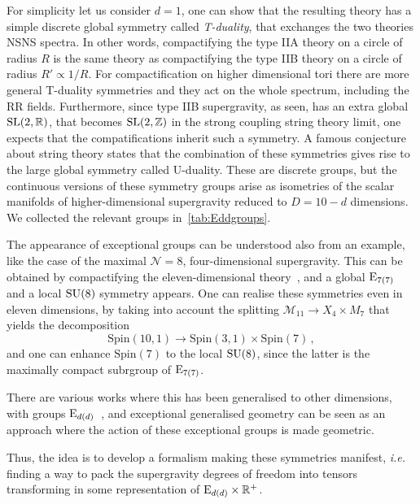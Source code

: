 \documentclass[debug]{phd}
\begin{document}
					For simplicity let us consider $d=1$, one can show that the resulting theory has a simple discrete global symmetry called \emph{T-duality}, that exchanges the two theories NSNS spectra.
					In other words, compactifying the type IIA theory on a circle of radius $R$ is the same theory as compactifying the type IIB theory on a circle of radius $R' \propto 1/R$.
					For compactification on higher dimensional tori there are more general T-duality symmetries and they act on the whole spectrum, including the RR fields.
					Furthermore, since type IIB supergravity, as seen, has an extra global $\mathrm{SL}(2, \mathbb{R})$, that becomes $\mathrm{SL}(2,\mathbb{Z})$ in the strong coupling string theory limit, one expects that the compatifications inherit such a symmetry.
					A famous conjecture about string theory states that the combination of these symmetries gives rise to the large global symmetry called U-duality.
					These are discrete groups, but the continuous versions of these symmetry groups arise as isometries of the scalar manifolds of higher-dimensional supergravity reduced to $D=10-d$ dimensions. 
					We collected the relevant groups in~\cref{tab:Eddgroups}.
					
					The appearance of exceptional groups can be understood also from an example, like the case of the maximal $\mathcal{N}=8$, four-dimensional supergravity.
					This can be obtained by compactifying the eleven-dimensional theory~\cite{CremmerJulia}, and a global $\mathrm{E}_{7(7)}$ and a local $\mathrm{SU}(8)$ symmetry appears.
					One can realise these symmetries even in eleven dimensions, by taking into account the splitting $\mathcal{M}_{11} \rightarrow X_4 \times M_7$ that yields the decomposition
							\begin{equation*}
								\mathrm{Spin}(10,1) \rightarrow \mathrm{Spin}(3,1) \times \mathrm{Spin}(7)\, ,
							\end{equation*}
					 and one can enhance $\mathrm{Spin}(7)$ to the local $\mathrm{SU}(8)$, since the latter is the maximally compact subrgroup of $\mathrm{E}_{7(7)}$.
										 
					 There are various works where this has been generalised to other dimensions, with groups $\mathrm{E}_{d(d)}$~\cite{NicolaiSamt, deWitNicolHidden, NicolaiN16, NicolaiSO16}, and exceptional generalised geometry can be seen as an approach where the action of these exceptional groups is made geometric.
					 
					 Thus, the idea is to develop a formalism making these symmetries manifest, \emph{i.e.} finding a way to pack the supergravity degrees of freedom into tensors transforming in some representation of $\mathrm{E}_{d(d)}\times \mathbb{R}^+$.
				
\end{document}
